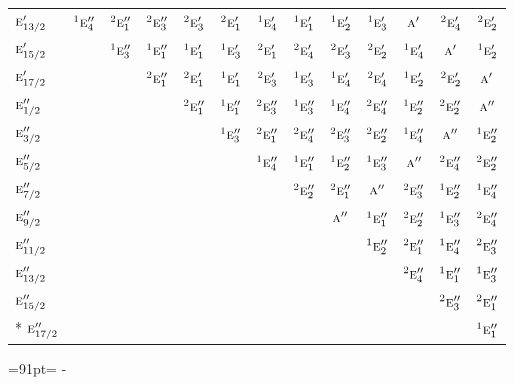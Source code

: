 \documentclass[10pt,a4paper]{article}
\newcommand{\needspace}[1]{\par\penalty-100\begingroup\dimen0=#1\relax\dimen2=\pagegoal
  \advance\dimen2-\pagetotal\ifdim\dimen0>\dimen2\relax\ifdim\dimen2>0pt\vfil\break\fi\fi
  \endgroup}
\numberwithin{equation}{section}
\newcommand{\irr}[1]{\text{\normalfont\scshape #1}}
\newcommand{\conjpair}[1]{{}^{#1}}
\begin{document}
{\begin{longtable}{@{}lcccccccccccc@{}}
$\irr{e}_{13/2}'$ & $\conjpair{1}\irr{e}_{4}''$ & $\conjpair{2}\irr{e}_{1}''$ & $\conjpair{2}\irr{e}_{3}''$ & $\conjpair{2}\irr{e}_{3}'$ & $\conjpair{2}\irr{e}_{1}'$ & $\conjpair{1}\irr{e}_{4}'$ & $\conjpair{1}\irr{e}_{1}'$ & $\conjpair{1}\irr{e}_{2}'$ & $\conjpair{1}\irr{e}_{3}'$ & $\irr{a}'$ & $\conjpair{2}\irr{e}_{4}'$ & $\conjpair{2}\irr{e}_{2}'$\\
$\irr{e}_{15/2}'$ &  & $\conjpair{1}\irr{e}_{3}''$ & $\conjpair{1}\irr{e}_{1}''$ & $\conjpair{1}\irr{e}_{1}'$ & $\conjpair{1}\irr{e}_{3}'$ & $\conjpair{2}\irr{e}_{1}'$ & $\conjpair{2}\irr{e}_{4}'$ & $\conjpair{2}\irr{e}_{3}'$ & $\conjpair{2}\irr{e}_{2}'$ & $\conjpair{1}\irr{e}_{4}'$ & $\irr{a}'$ & $\conjpair{1}\irr{e}_{2}'$\\
$\irr{e}_{17/2}'$ &  &  & $\conjpair{2}\irr{e}_{1}''$ & $\conjpair{2}\irr{e}_{1}'$ & $\conjpair{1}\irr{e}_{1}'$ & $\conjpair{2}\irr{e}_{3}'$ & $\conjpair{1}\irr{e}_{3}'$ & $\conjpair{1}\irr{e}_{4}'$ & $\conjpair{2}\irr{e}_{4}'$ & $\conjpair{1}\irr{e}_{2}'$ & $\conjpair{2}\irr{e}_{2}'$ & $\irr{a}'$\\
$\irr{e}_{1/2}''$ &  &  &  & $\conjpair{2}\irr{e}_{1}''$ & $\conjpair{1}\irr{e}_{1}''$ & $\conjpair{2}\irr{e}_{3}''$ & $\conjpair{1}\irr{e}_{3}''$ & $\conjpair{1}\irr{e}_{4}''$ & $\conjpair{2}\irr{e}_{4}''$ & $\conjpair{1}\irr{e}_{2}''$ & $\conjpair{2}\irr{e}_{2}''$ & $\irr{a}''$\\
$\irr{e}_{3/2}''$ &  &  &  &  & $\conjpair{1}\irr{e}_{3}''$ & $\conjpair{2}\irr{e}_{1}''$ & $\conjpair{2}\irr{e}_{4}''$ & $\conjpair{2}\irr{e}_{3}''$ & $\conjpair{2}\irr{e}_{2}''$ & $\conjpair{1}\irr{e}_{4}''$ & $\irr{a}''$ & $\conjpair{1}\irr{e}_{2}''$\\
$\irr{e}_{5/2}''$ &  &  &  &  &  & $\conjpair{1}\irr{e}_{4}''$ & $\conjpair{1}\irr{e}_{1}''$ & $\conjpair{1}\irr{e}_{2}''$ & $\conjpair{1}\irr{e}_{3}''$ & $\irr{a}''$ & $\conjpair{2}\irr{e}_{4}''$ & $\conjpair{2}\irr{e}_{2}''$\\
$\irr{e}_{7/2}''$ &  &  &  &  &  &  & $\conjpair{2}\irr{e}_{2}''$ & $\conjpair{2}\irr{e}_{1}''$ & $\irr{a}''$ & $\conjpair{2}\irr{e}_{3}''$ & $\conjpair{1}\irr{e}_{2}''$ & $\conjpair{1}\irr{e}_{4}''$\\
$\irr{e}_{9/2}''$ &  &  &  &  &  &  &  & $\irr{a}''$ & $\conjpair{1}\irr{e}_{1}''$ & $\conjpair{2}\irr{e}_{2}''$ & $\conjpair{1}\irr{e}_{3}''$ & $\conjpair{2}\irr{e}_{4}''$\\
$\irr{e}_{11/2}''$ &  &  &  &  &  &  &  &  & $\conjpair{1}\irr{e}_{2}''$ & $\conjpair{2}\irr{e}_{1}''$ & $\conjpair{1}\irr{e}_{4}''$ & $\conjpair{2}\irr{e}_{3}''$\\
$\irr{e}_{13/2}''$ &  &  &  &  &  &  &  &  &  & $\conjpair{2}\irr{e}_{4}''$ & $\conjpair{1}\irr{e}_{1}''$ & $\conjpair{1}\irr{e}_{3}''$\\
$\irr{e}_{15/2}''$ &  &  &  &  &  &  &  &  &  &  & $\conjpair{2}\irr{e}_{3}''$ & $\conjpair{2}\irr{e}_{1}''$\\*
$\irr{e}_{17/2}''$ &  &  &  &  &  &  &  &  &  &  &  & $\conjpair{1}\irr{e}_{1}''$\\
\bottomrule\end{longtable}}
\needspace{91pt}
\end{document}
